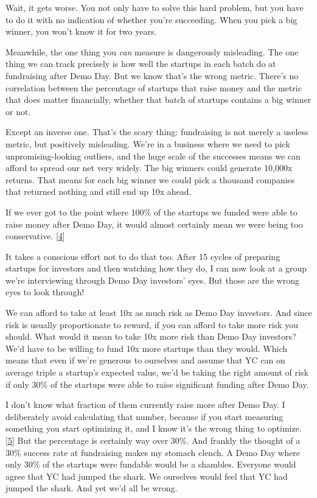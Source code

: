 Wait, it gets worse. You not only have to solve this hard problem, but
you have to do it with no indication of whether you're succeeding. When
you pick a big winner, you won't know it for two years.

Meanwhile, the one thing you \emph{can} measure is dangerously
misleading. The one thing we can track precisely is how well the
startups in each batch do at fundraising after Demo Day. But we know
that's the wrong metric. There's no correlation between the percentage
of startups that raise money and the metric that does matter
financially, whether that batch of startups contains a big winner or
not.

Except an inverse one. That's the scary thing: fundraising is not merely
a useless metric, but positively misleading. We're in a business where
we need to pick unpromising-looking outliers, and the huge scale of the
successes means we can afford to spread our net very widely. The big
winners could generate 10,000x returns. That means for each big winner
we could pick a thousand companies that returned nothing and still end
up 10x ahead.

If we ever got to the point where 100\% of the startups we funded were
able to raise money after Demo Day, it would almost certainly mean we
were being too conservative. {[}\hyperref[f4n]{4}{]}

It takes a conscious effort not to do that too. After 15 cycles of
preparing startups for investors and then watching how they do, I can
now look at a group we're interviewing through Demo Day investors' eyes.
But those are the wrong eyes to look through!

We can afford to take at least 10x as much risk as Demo Day investors.
And since risk is usually proportionate to reward, if you can afford to
take more risk you should. What would it mean to take 10x more risk than
Demo Day investors? We'd have to be willing to fund 10x more startups
than they would. Which means that even if we're generous to ourselves
and assume that YC can on average triple a startup's expected value,
we'd be taking the right amount of risk if only 30\% of the startups
were able to raise significant funding after Demo Day.

I don't know what fraction of them currently raise more after Demo Day.
I deliberately avoid calculating that number, because if you start
measuring something you start optimizing it, and I know it's the wrong
thing to optimize. {[}\hyperref[f5n]{5}{]} But the percentage is
certainly way over 30\%. And frankly the thought of a 30\% success rate
at fundraising makes my stomach clench. A Demo Day where only 30\% of
the startups were fundable would be a shambles. Everyone would agree
that YC had jumped the shark. We ourselves would feel that YC had jumped
the shark. And yet we'd all be wrong.

